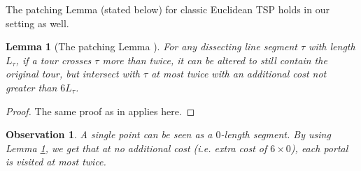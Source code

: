 \documentclass[10pt,a4paper]{amsart}
\theoremstyle{thmstyleone}
\newtheorem{lemma}{Lemma}
\newtheorem{observation}{Observation} %
\begin{document}
The patching Lemma (stated below) for classic Euclidean TSP holds in our setting as well.
\begin{lemma}[The patching Lemma \cite{Arora98}]\label{lemma:patching-lemma}
    For any dissecting line segment $\tau$ with length $L_\tau$, if a tour crosses $\tau$ more than twice, it can be altered to still contain the original tour, but intersect with $\tau$ at most twice with an additional cost not greater than $6L_\tau$. 
\end{lemma}
\begin{proof}
    The same proof as in \cite{Arora98} applies here.
\end{proof}


\begin{observation}\label{cor:portal-twice}
	A single point can be seen as a $ 0 $-length segment. By using Lemma \ref{lemma:patching-lemma}, we get that at no additional cost (i.e. extra cost of $ 6\times 0 $), each portal is visited at most twice.
\end{observation}
\end{document}
